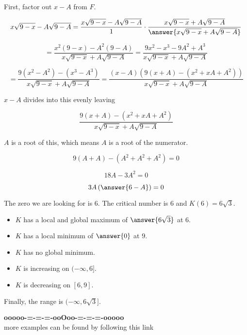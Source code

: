 \documentclass{ximera}
\begin{document}
\begin{procedure}
First, factor out $x-A$ from $F$.


\[
x\sqrt{9-x} - A\sqrt{9-A} = \frac{x\sqrt{9-x} - A\sqrt{9-A}}{1} \cdot \frac{x\sqrt{9-x} + A\sqrt{9-A}}{\answer{x\sqrt{9-x} + A\sqrt{9-A}}}
\]

\[
= \frac{x^2 (9-x) - A^2 (9-A)}{x\sqrt{9-x} + A\sqrt{9-A}} = \frac{9x^2 - x^3 - 9A^2 + A^3}{x\sqrt{9-x} + A\sqrt{9-A}}
\]


\[
= \frac{9(x^2-A^2) - (x^3 - A^3)}{x\sqrt{9-x} + A\sqrt{9-A}} = \frac{(x-A)(9(x+A)-(x^2 + xA + A^2))}{x\sqrt{9-x} + A\sqrt{9-A}}
\]


$x-A$ divides into this evenly leaving

\[
\frac{9(x+A)-(x^2 + xA + A^2)}{x\sqrt{9-x} + A\sqrt{9-A}}
\]

$A$ is a root of this, which means $A$ is a root of the numerator.


\[
9(A+A)-(A^2 + A^2 + A^2) = 0
\]

\[
18A - 3A^2 = 0
\]

\[
3A \left(\answer{6-A} \right) = 0
\]


The zero we are looking for is $6$.
The critical number is $6$ and $K(6) = 6 \sqrt{3}$.


\end{procedure}


\begin{itemize}
\item $K$ has a local and global maximum of $\answer{6\sqrt{3}}$ at $6$.
\item $K$ has a local minimum of $\answer{0}$ at $9$.
\item $K$ has no global minimum.
\end{itemize}




\begin{itemize}
\item $K$ is increasing on $(-\infty, 6]$.
\item $K$ is decreasing on $[6, 9]$.
\end{itemize}


Finally, the range is $(-\infty, 6\sqrt{3}]$. \\



















\begin{center}
\textbf{\textcolor{green!50!black}{ooooo-=-=-=-ooOoo-=-=-=-ooooo}} \\

more examples can be found by following this link\\ 

\end{center}
\end{document}
